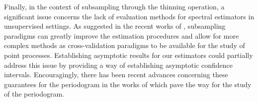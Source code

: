 Finally, in the context of subsampling through the thinning operation, a significant issue concerns the lack of evaluation methods for spectral estimators in unsupervised settings.
As suggested in the recent works of \textcite{Cronie2024, Coeurjolly2024}, subsampling paradigms can greatly improve the estimation procedures and allow for more complex methods as cross-validation paradigms to be available for the study of point processes. 
Establishing asymptotic results for our estimators could partially address this issue by providing a way of establishing asymptotic confidence intervals. Encouragingly, there has been recent advances concerning these guarantees for the periodogram in the works of \textcite{Rajala2023, Yang2024} which pave the way for the study of the periodogram.

